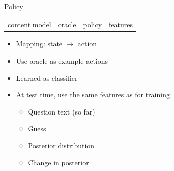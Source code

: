 \begin{frame}{Policy}

\begin{block}{}
  \begin{center}
    \vspace{-.5cm}
    \begin{tabular}{cccc}
      content model & oracle & \alert{policy} & features \\
    \end{tabular}
    \vspace{-.5cm}
  \end{center}
\end{block}

 \begin{itemize}
    \item Mapping: state $\mapsto$ action
    \item Use oracle as example actions
    \item Learned as classifier \cite{langford-05}
    \item At test time, use the same features as for training
      \begin{itemize}
        \item Question text (so far)
        \item Guess
        \item Posterior distribution
        \item Change in posterior
      \end{itemize}
\end{itemize}

\end{frame}



